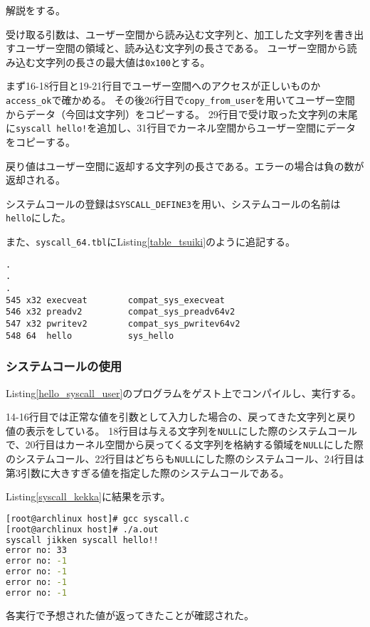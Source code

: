 \documentclass[main]{subfiles}
\begin{document}
解説をする。

受け取る引数は、ユーザー空間から読み込む文字列と、加工した文字列を書き出すユーザー空間の領域と、読み込む文字列の長さである。
ユーザー空間から読み込む文字列の長さの最大値は\texttt{0x100}とする。

まず16-18行目と19-21行目でユーザー空間へのアクセスが正しいものか\texttt{access\_ok}で確かめる。
その後26行目で\texttt{copy\_from\_user}を用いてユーザー空間からデータ（今回は文字列）をコピーする。
29行目で受け取った文字列の末尾に\texttt{syscall hello!}を追加し、31行目でカーネル空間からユーザー空間にデータをコピーする。

戻り値はユーザー空間に返却する文字列の長さである。エラーの場合は負の数が返却される。

システムコールの登録は\texttt{SYSCALL\_DEFINE3}を用い、システムコールの名前は\texttt{hello}にした。

また、\texttt{syscall\_64.tbl}にListing\ref{table_tsuiki}のように追記する。

\begin{lstlisting}[label=table_tsuiki,caption=\texttt{syscall\_64.tbl}に追加する]
.
.
.
545	x32	execveat		compat_sys_execveat
546	x32	preadv2			compat_sys_preadv64v2
547	x32	pwritev2		compat_sys_pwritev64v2
548 64  hello           sys_hello
\end{lstlisting}

\subsubsection{システムコールの使用}

Listing\ref{hello_syscall_user}のプログラムをゲスト上でコンパイルし、実行する。



14-16行目では正常な値を引数として入力した場合の、戻ってきた文字列と戻り値の表示をしている。
18行目は与える文字列を\texttt{NULL}にした際のシステムコールで、20行目はカーネル空間から戻ってくる文字列を格納する領域を\texttt{NULL}にした際のシステムコール、22行目はどちらも\texttt{NULL}にした際のシステムコール、24行目は第3引数に大きすぎる値を指定した際のシステムコールである。

Listing\ref{syscall_kekka}に結果を示す。

\begin{lstlisting}[label=syscall_kekka,caption=システムコールの実行結果,language=sh]
[root@archlinux host]# gcc syscall.c
[root@archlinux host]# ./a.out
syscall jikken syscall hello!!
error no: 33
error no: -1
error no: -1
error no: -1
error no: -1
\end{lstlisting}

各実行で予想された値が返ってきたことが確認された。
\end{document}
